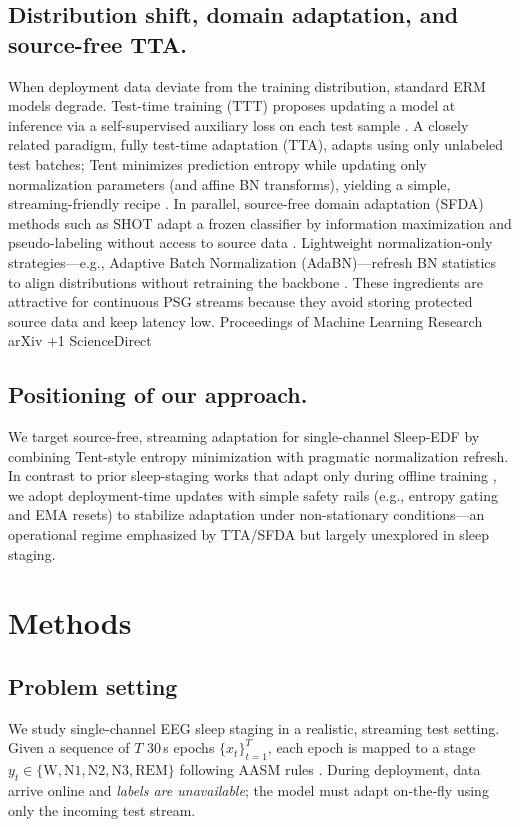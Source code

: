 \documentclass{article}
\begin{document}
\subsection{Distribution shift, domain adaptation, and source-free TTA.}
When deployment data deviate from the training distribution, standard ERM models degrade. Test-time training (TTT) proposes updating a model at inference via a self-supervised auxiliary loss on each test sample \citep{sun2020ttt}. A closely related paradigm, fully test-time adaptation (TTA), adapts using only unlabeled test batches; Tent minimizes prediction entropy while updating only normalization parameters (and affine BN transforms), yielding a simple, streaming-friendly recipe \citep{wang2021tent}. In parallel, source-free domain adaptation (SFDA) methods such as SHOT adapt a frozen classifier by information maximization and pseudo-labeling without access to source data \citep{liang2020shot}. Lightweight normalization-only strategies—e.g., Adaptive Batch Normalization (AdaBN)—refresh BN statistics to align distributions without retraining the backbone \citep{Li2018AdaBN}. These ingredients are attractive for continuous PSG streams because they avoid storing protected source data and keep latency low. 
Proceedings of Machine Learning Research
arXiv
+1
ScienceDirect

\subsection{Positioning of our approach.}
We target source-free, streaming adaptation for single-channel Sleep-EDF by combining Tent-style entropy minimization with pragmatic normalization refresh. In contrast to prior sleep-staging works that adapt only during offline training \citep{supratak2017deepsleepnet,perslev2019utime,Phan2019SeqSleepNet}, we adopt deployment-time updates with simple safety rails (e.g., entropy gating and EMA resets) to stabilize adaptation under non-stationary conditions—an operational regime emphasized by TTA/SFDA but largely unexplored in sleep staging.


\section{Methods}
\label{sec:methods}

\subsection{Problem setting}
We study single-channel EEG sleep staging in a realistic, streaming test setting. Given a sequence of $T$ 30\,s epochs $\{x_t\}_{t=1}^T$, each epoch is mapped to a stage $y_t \in \{\text{W}, \text{N1}, \text{N2}, \text{N3}, \text{REM}\}$ following AASM rules \citep{Iber2007AASM,berry2012aasm}. During deployment, data arrive online and \emph{labels are unavailable}; the model must adapt on‐the‐fly using only the incoming test stream.
\end{document}
